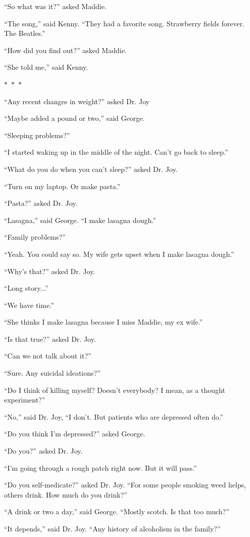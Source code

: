 \documentclass{memoir}
\newcommand{\starbreak}{%
\begin{center}
  $\ast$~$\ast$~$\ast$
\end{center}
}
\begin{document}
``So what was it?'' asked Maddie.

``The song,'' said Kenny. ``They had a favorite song. Strawberry fields forever. The Beatles.''

``How did you find out?'' asked Maddie.

``She told me,'' said Kenny. 

\starbreak

``Any recent changes in weight?'' asked Dr. Joy

``Maybe added a pound or two,'' said George.

``Sleeping problems?''

``I started waking up in the middle of the night. Can't go back to sleep.''

``What do you do when you can't sleep?'' asked Dr. Joy.

``Turn on my laptop. Or make pasta.''

``Pasta?'' asked Dr. Joy.

``Lasagna,'' said George. ``I make lasagna dough.''

``Family problems?''

``Yeah. You could say so. My wife gets upset when I make lasagna dough.''

``Why's that?'' asked Dr. Joy.

``Long story...''

``We have time.''

``She thinks I make lasagna because I miss Maddie, my ex wife.''

``Is that true?'' asked Dr. Joy.

``Can we not talk about it?''

``Sure. Any suicidal ideations?''

``Do I think of killing myself? Doesn't everybody? I mean, as a thought experiment?''

``No,'' said Dr. Joy, ``I don't. But patients who are depressed often do.''

``Do you think I'm depressed?'' asked George.

``Do you?'' asked Dr. Joy.

``I'm going through a rough patch right now. But it will pass.'' 

``Do you self-medicate?'' asked Dr. Joy. ``For some people smoking weed helps, others drink. How much do you drink?''

``A drink or two a day,'' said George. ``Mostly scotch. Is that too much?''

``It depends,'' said Dr. Joy. ``Any history of alcoholism in the family?''
\end{document}
